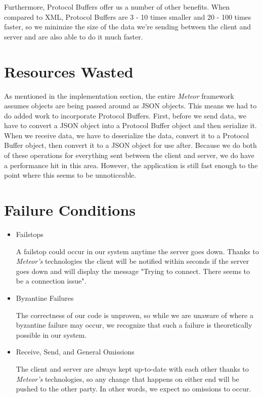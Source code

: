 \documentclass[a4paper, 11pt]{article} %
\begin{document}
Furthermore, Protocol Buffers offer us a number of other benefits. When compared to XML, Protocol Buffers are 3 - 10 times smaller and 20 - 100 times faster, so we minimize the size of the data we're sending between the client and server and are also able to do it much faster.

\section*{Resources Wasted}

As mentioned in the implementation section, the entire \textit{Meteor} framework assumes objects are being passed around as JSON objects. This means we had to do added work to incorporate Protocol Buffers. First, before we send data, we have to convert a JSON object into a Protocol Buffer object and then serialize it. When we receive data, we have to deserialize the data, convert it to a Protocol Buffer object, then convert it to a JSON object for use after. Because we do both of these operations for everything sent between the client and server, we do have a performance hit in this area. However, the application is still fast enough to the point where this seems to be unnoticeable.

\section*{Failure Conditions}

\begin{itemize}
	\item Failstops
	
	A failstop could occur in our system anytime the server goes down. Thanks to \textit{Meteor's} technologies the client will be notified within seconds if the server goes down and will display the message "Trying to connect. There seems to be a connection issue".
	
	\item Byzantine Failures
	
	The correctness of our code is unproven, so while we are unaware of where a byzantine failure may occur, we recognize that such a failure is theoretically possible in our system.
	
	\item Receive, Send, and General Omissions
	
	The client and server are always kept up-to-date with each other thanks to \textit{Meteor's} technologies, so any change that happens on either end will be pushed to the other party. In other words, we expect no omissions to occur. 
\end{itemize}	
\end{document}
